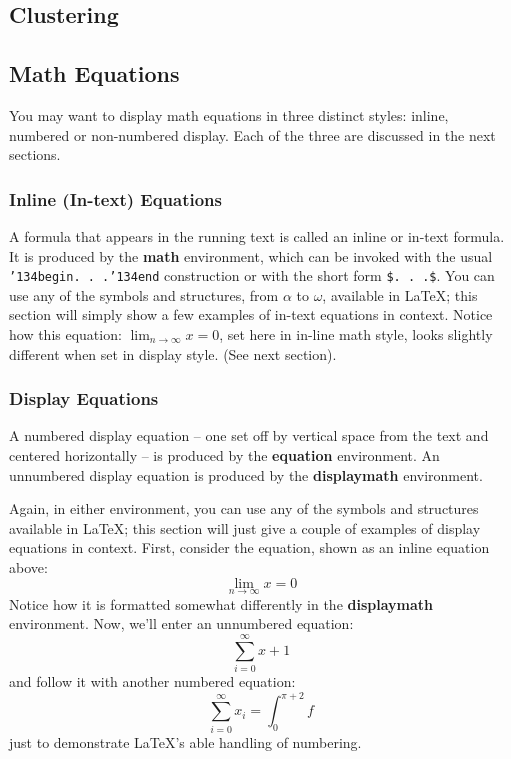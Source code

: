 \documentclass{sig-alternate-05-2015}
\begin{document}
\subsection{Clustering}



\subsection{Math Equations}
You may want to display math equations in three distinct styles:
inline, numbered or non-numbered display.  Each of
the three are discussed in the next sections.

\subsubsection{Inline (In-text) Equations}
A formula that appears in the running text is called an
inline or in-text formula.  It is produced by the
\textbf{math} environment, which can be
invoked with the usual \texttt{{\char'134}begin. . .{\char'134}end}
construction or with the short form \texttt{\$. . .\$}. You
can use any of the symbols and structures,
from $\alpha$ to $\omega$, available in
\LaTeX\cite{Lamport:LaTeX}; this section will simply show a
few examples of in-text equations in context. Notice how
this equation: \begin{math}\lim_{n\rightarrow \infty}x=0\end{math},
set here in in-line math style, looks slightly different when
set in display style.  (See next section).

\subsubsection{Display Equations}
A numbered display equation -- one set off by vertical space
from the text and centered horizontally -- is produced
by the \textbf{equation} environment. An unnumbered display
equation is produced by the \textbf{displaymath} environment.

Again, in either environment, you can use any of the symbols
and structures available in \LaTeX; this section will just
give a couple of examples of display equations in context.
First, consider the equation, shown as an inline equation above:
\begin{equation}\lim_{n\rightarrow \infty}x=0\end{equation}
Notice how it is formatted somewhat differently in
the \textbf{displaymath}
environment.  Now, we'll enter an unnumbered equation:
\begin{displaymath}\sum_{i=0}^{\infty} x + 1\end{displaymath}
and follow it with another numbered equation:
\begin{equation}\sum_{i=0}^{\infty}x_i=\int_{0}^{\pi+2} f\end{equation}
just to demonstrate \LaTeX's able handling of numbering.
\end{document}
